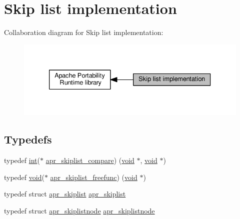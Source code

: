 \hypertarget{group__apr__skiplist}{}\section{Skip list implementation}
\label{group__apr__skiplist}
Collaboration diagram for Skip list implementation\+:
\nopagebreak
\begin{figure}[H]
\begin{center}
\leavevmode
\includegraphics[width=333pt]{group__apr__skiplist}
\end{center}
\end{figure}
\subsection*{Typedefs}
\begin{DoxyCompactItemize}
\item 
typedef \hyperlink{pcre_8txt_a42dfa4ff673c82d8efe7144098fbc198}{int}($\ast$ \hyperlink{group__apr__skiplist_ga873aa114e692e48c6587277680ceba87}{apr\+\_\+skiplist\+\_\+compare}) (\hyperlink{group__MOD__ISAPI_gacd6cdbf73df3d9eed42fa493d9b621a6}{void} $\ast$, \hyperlink{group__MOD__ISAPI_gacd6cdbf73df3d9eed42fa493d9b621a6}{void} $\ast$)
\item 
typedef \hyperlink{group__MOD__ISAPI_gacd6cdbf73df3d9eed42fa493d9b621a6}{void}($\ast$ \hyperlink{group__apr__skiplist_ga326fdccaf516e5296969fa03bbda3fca}{apr\+\_\+skiplist\+\_\+freefunc}) (\hyperlink{group__MOD__ISAPI_gacd6cdbf73df3d9eed42fa493d9b621a6}{void} $\ast$)
\item 
typedef struct \hyperlink{structapr__skiplist}{apr\+\_\+skiplist} \hyperlink{group__apr__skiplist_gac79ddf14bb5cb5b6d35961309eadec48}{apr\+\_\+skiplist}
\item 
typedef struct \hyperlink{structapr__skiplistnode}{apr\+\_\+skiplistnode} \hyperlink{group__apr__skiplist_gafb934f577d03de823aa4d62b41399bc0}{apr\+\_\+skiplistnode}
\end{DoxyCompactItemize}
